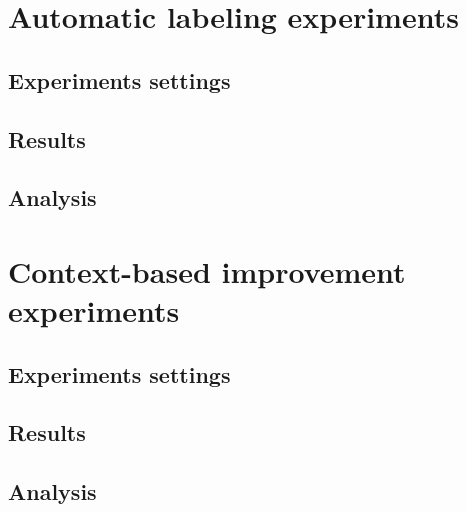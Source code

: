 \section{Automatic labeling experiments}
\subsection{Experiments settings}
\subsection{Results}
\subsection{Analysis}


\section{Context-based improvement experiments}
\subsection{Experiments settings}
\subsection{Results}
\subsection{Analysis}